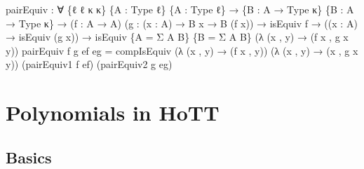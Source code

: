 \documentclass[
  11pt,
  oneside,
  article]{memoir}
\newenvironment{Shaded}{}{}
\newcommand{\NormalTok}[1]{#1}
\newcommand{\OtherTok}[1]{\textcolor[rgb]{0.00,0.44,0.13}{#1}}
\theoremstyle{definition}
\theoremstyle{plain}
\newcommand{\0}{\textsf{0}}
\newcommand{\1}{\tn{\textsf{1}}}
\begin{document}
\begin{Shaded}
\begin{Highlighting}[]
\NormalTok{pairEquiv }\OtherTok{:} \OtherTok{∀} \OtherTok{\{}\NormalTok{ℓ ℓ\textquotesingle{} κ κ\textquotesingle{}}\OtherTok{\}} \OtherTok{\{}\NormalTok{A }\OtherTok{:}\NormalTok{ Type ℓ}\OtherTok{\}} \OtherTok{\{}\NormalTok{A\textquotesingle{} }\OtherTok{:}\NormalTok{ Type ℓ\textquotesingle{}}\OtherTok{\}}
            \OtherTok{→} \OtherTok{\{}\NormalTok{B }\OtherTok{:}\NormalTok{ A }\OtherTok{→}\NormalTok{ Type κ}\OtherTok{\}} \OtherTok{\{}\NormalTok{B\textquotesingle{} }\OtherTok{:}\NormalTok{ A\textquotesingle{} }\OtherTok{→}\NormalTok{ Type κ\textquotesingle{}}\OtherTok{\}}
            \OtherTok{→} \OtherTok{(}\NormalTok{f }\OtherTok{:}\NormalTok{ A }\OtherTok{→}\NormalTok{ A\textquotesingle{}}\OtherTok{)} \OtherTok{(}\NormalTok{g }\OtherTok{:} \OtherTok{(}\NormalTok{x }\OtherTok{:}\NormalTok{ A}\OtherTok{)} \OtherTok{→}\NormalTok{ B x }\OtherTok{→}\NormalTok{ B\textquotesingle{} }\OtherTok{(}\NormalTok{f x}\OtherTok{))}
            \OtherTok{→}\NormalTok{ isEquiv f }\OtherTok{→} \OtherTok{((}\NormalTok{x }\OtherTok{:}\NormalTok{ A}\OtherTok{)} \OtherTok{→}\NormalTok{ isEquiv }\OtherTok{(}\NormalTok{g x}\OtherTok{))}
            \OtherTok{→}\NormalTok{ isEquiv }\OtherTok{\{}\NormalTok{A }\OtherTok{=}\NormalTok{ Σ A B}\OtherTok{\}} \OtherTok{\{}\NormalTok{B }\OtherTok{=}\NormalTok{ Σ A\textquotesingle{} B\textquotesingle{}}\OtherTok{\}}
                      \OtherTok{(λ} \OtherTok{(}\NormalTok{x , y}\OtherTok{)} \OtherTok{→} \OtherTok{(}\NormalTok{f x , g x y}\OtherTok{))}
\NormalTok{pairEquiv f g ef eg }\OtherTok{=} 
\NormalTok{    compIsEquiv }\OtherTok{(λ} \OtherTok{(}\NormalTok{x , y}\OtherTok{)} \OtherTok{→} \OtherTok{(}\NormalTok{f x , y}\OtherTok{))} 
                \OtherTok{(λ} \OtherTok{(}\NormalTok{x , y}\OtherTok{)} \OtherTok{→} \OtherTok{(}\NormalTok{x , g x y}\OtherTok{))} 
                \OtherTok{(}\NormalTok{pairEquiv1 f ef}\OtherTok{)} 
                \OtherTok{(}\NormalTok{pairEquiv2 g eg}\OtherTok{)}
\end{Highlighting}
\end{Shaded}

\chapter{Polynomials in HoTT}\label{polynomials-in-hott}

\section{Basics}\label{basics}
\end{document}
